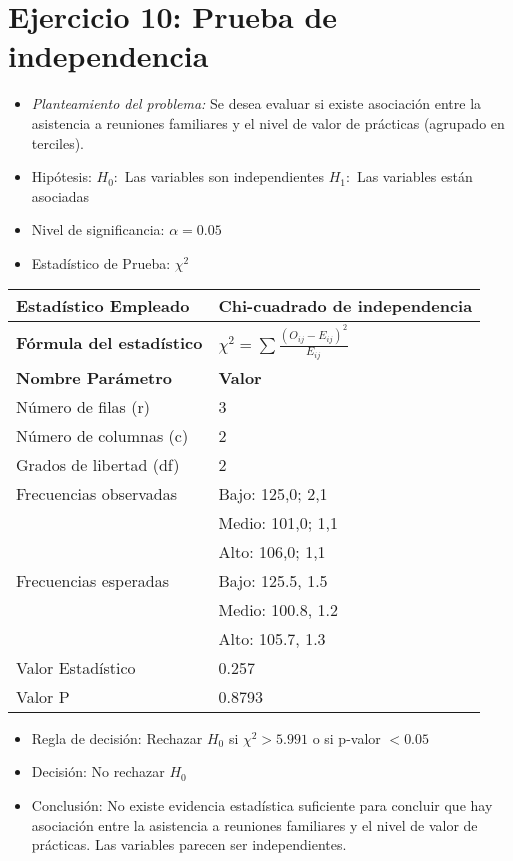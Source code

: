 \documentclass[12pt,a4paper]{article}
\begin{document}
\section*{Ejercicio 10: Prueba de independencia}
\begin{itemize}
    \item \textit{Planteamiento del problema:} Se desea evaluar si existe asociación entre la asistencia a reuniones familiares y el nivel de valor de prácticas (agrupado en terciles).
    \item Hipótesis: \quad $H_{0}:$ Las variables son independientes \hspace{2cm} $H_{1}:$ Las variables están asociadas
    \item Nivel de significancia: $\alpha = 0.05$
    \item Estadístico de Prueba: $\chi^2$
\end{itemize}

\begin{tabular}{|m{7cm}|m{7cm}|}
\hline
\textbf{Estadístico Empleado} & Chi-cuadrado de independencia \\ \hline
\textbf{Fórmula del estadístico} & $\chi^2 = \sum \frac{(O_{ij} - E_{ij})^2}{E_{ij}}$ \\ \hline
\textbf{Nombre Parámetro} & \textbf{Valor} \\ \hline
Número de filas (r) & 3 \\ \hline
Número de columnas (c) & 2 \\ \hline
Grados de libertad (df) & 2 \\ \hline
Frecuencias observadas & Bajo: 125,0; 2,1 \\ \hline
& Medio: 101,0; 1,1 \\ \hline
& Alto: 106,0; 1,1 \\ \hline
Frecuencias esperadas & Bajo: 125.5, 1.5 \\ \hline
& Medio: 100.8, 1.2 \\ \hline
& Alto: 105.7, 1.3 \\ \hline
Valor Estadístico & 0.257 \\ \hline
Valor P & 0.8793 \\ \hline
\end{tabular}

\begin{itemize}
    \item Regla de decisión: Rechazar $H_0$ si $\chi^2 > 5.991$ o si p-valor $< 0.05$
    \item Decisión: No rechazar $H_0$
    \item Conclusión: No existe evidencia estadística suficiente para concluir que hay asociación entre la asistencia a reuniones familiares y el nivel de valor de prácticas. Las variables parecen ser independientes.
\end{itemize}
\end{document}
